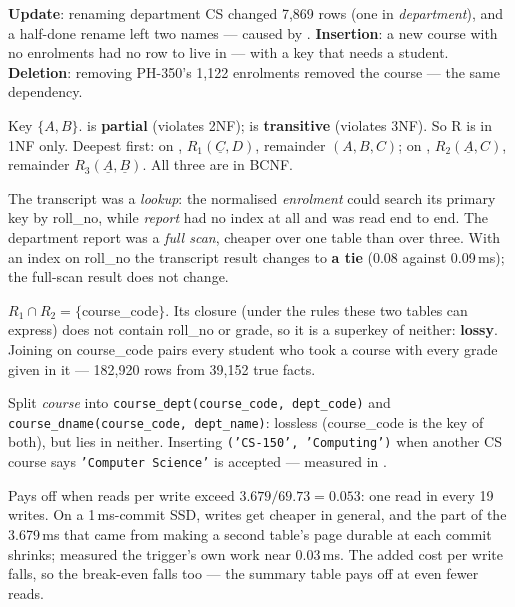 \begin{ans}
  \item \textbf{Update}: renaming department CS changed 7{,}869 rows (one in
        \textit{department}), and a half-done rename left two names --- caused
        by . \textbf{Insertion}: a new course with no
        enrolments had no row to live in --- 
        with a key that needs a student. \textbf{Deletion}: removing PH-350's
        1{,}122 enrolments removed the course --- the same dependency.
  \item Key $\{A, B\}$.  is \textbf{partial} (violates 2NF);
         is \textbf{transitive} (violates 3NF). So R is in 1NF only.
        Deepest first: on , $R_1(\underline{C}, D)$, remainder
        $(A, B, C)$; on , $R_2(\underline{A}, C)$, remainder
        $R_3(\underline{A}, \underline{B})$. All three are in BCNF.
  \item The transcript was a \emph{lookup}: the normalised \textit{enrolment}
        could search its primary key by roll\_no, while \textit{report} had no
        index at all and was read end to end. The department report was a
        \emph{full scan}, cheaper over one table than over three. With an index
        on roll\_no the transcript result changes to \textbf{a tie} (0.08 against
        0.09\,ms); the full-scan result does not change.
\end{ans}

\begin{ans}
  \item $R_1 \cap R_2 = \{$course\_code$\}$. Its closure (under the rules
        these two tables can express) does not contain roll\_no or grade, so
        it is a superkey of neither: \textbf{lossy}. Joining on course\_code
        pairs every student who took a course with every grade given in it ---
        182{,}920 rows from 39{,}152 true facts.
  \item Split \textit{course} into \texttt{course\_dept(course\_code,
        dept\_code)} and \texttt{course\_dname(course\_code, dept\_name)}:
        lossless (course\_code is the key of both), but 
        lies in neither. Inserting \texttt{('CS-150', 'Computing')} when
        another CS course says \texttt{'Computer Science'} is accepted ---
        measured in .
  \item Pays off when reads per write exceed $3.679 / 69.73 = 0.053$: one
        read in every 19 writes. On a 1\,ms-commit SSD, writes get cheaper in
        general, and the part of the 3.679\,ms that came from making a second
        table's page durable at each commit shrinks;  measured the
        trigger's own work near 0.03\,ms. The added cost per write falls, so the
        break-even falls too --- the summary table pays off at even fewer
        reads.
\end{ans}

